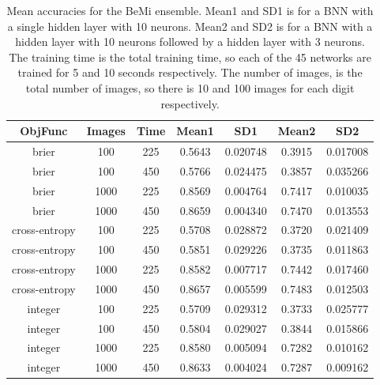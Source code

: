\begin{center}
\begin{table}[H]
\centering
\begin{tabular}{|c|c|c|c|c|c|c|}
  \hline
ObjFunc & Images & Time & Mean1 & SD1 & Mean2 & SD2 \\ 
  \hline
brier & 100 & 225 & 0.5643 & 0.020748 & 0.3915 & 0.017008 \\ 
   \hline
brier & 100 & 450 & 0.5766 & 0.024475 & 0.3857 & 0.035266 \\ 
   \hline
brier & 1000 & 225 & 0.8569 & 0.004764 & 0.7417 & 0.010035 \\ 
   \hline
brier & 1000 & 450 & 0.8659 & 0.004340 & 0.7470 & 0.013553 \\ 
   \hline
cross-entropy & 100 & 225 & 0.5708 & 0.028872 & 0.3720 & 0.021409 \\ 
   \hline
cross-entropy & 100 & 450 & 0.5851 & 0.029226 & 0.3735 & 0.011863 \\ 
   \hline
cross-entropy & 1000 & 225 & 0.8582 & 0.007717 & 0.7442 & 0.017460 \\ 
   \hline
cross-entropy & 1000 & 450 & 0.8657 & 0.005599 & 0.7483 & 0.012503 \\ 
   \hline
integer & 100 & 225 & 0.5709 & 0.029312 & 0.3733 & 0.025777 \\ 
   \hline
integer & 100 & 450 & 0.5804 & 0.029027 & 0.3844 & 0.015866 \\ 
   \hline
integer & 1000 & 225 & 0.8580 & 0.005094 & 0.7282 & 0.010162 \\ 
   \hline
integer & 1000 & 450 & 0.8633 & 0.004024 & 0.7287 & 0.009162 \\ 
   \hline
\end{tabular}
\caption{Mean accuracies for the BeMi ensemble. Mean1 and SD1 is for a BNN with a single hidden layer with
          10 neurons. Mean2 and SD2 is for a BNN with a hidden layer with 10 neurons followed by a hidden layer
          with 3 neurons. The training time is the total training time, so each of the 45 networks are trained for
          5 and 10 seconds respectively. The number of images, is the total number of images, so there is 10
          and 100 images for each digit respectively. } 
\label{BEMI_OBJ}
\end{table}

\end{center}

